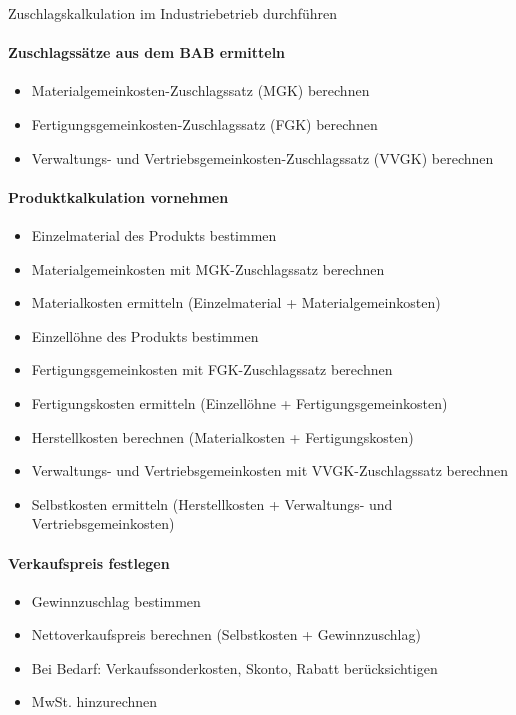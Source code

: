 \begin{KR}{Zuschlagskalkulation im Industriebetrieb durchführen}\\
\paragraph{Zuschlagssätze aus dem BAB ermitteln}
\begin{itemize}
    \item Materialgemeinkosten-Zuschlagssatz (MGK) berechnen
    \item Fertigungsgemeinkosten-Zuschlagssatz (FGK) berechnen
    \item Verwaltungs- und Vertriebsgemeinkosten-Zuschlagssatz (VVGK) berechnen
\end{itemize}

\paragraph{Produktkalkulation vornehmen}
\begin{itemize}
    \item Einzelmaterial des Produkts bestimmen
    \item Materialgemeinkosten mit MGK-Zuschlagssatz berechnen
    \item Materialkosten ermitteln (Einzelmaterial + Materialgemeinkosten)
    \item Einzellöhne des Produkts bestimmen
    \item Fertigungsgemeinkosten mit FGK-Zuschlagssatz berechnen
    \item Fertigungskosten ermitteln (Einzellöhne + Fertigungsgemeinkosten)
    \item Herstellkosten berechnen (Materialkosten + Fertigungskosten)
    \item Verwaltungs- und Vertriebsgemeinkosten mit VVGK-Zuschlagssatz berechnen
    \item Selbstkosten ermitteln (Herstellkosten + Verwaltungs- und Vertriebsgemeinkosten)
\end{itemize}

\paragraph{Verkaufspreis festlegen}
\begin{itemize}
    \item Gewinnzuschlag bestimmen
    \item Nettoverkaufspreis berechnen (Selbstkosten + Gewinnzuschlag)
    \item Bei Bedarf: Verkaufssonderkosten, Skonto, Rabatt berücksichtigen
    \item MwSt. hinzurechnen
\end{itemize}
\end{KR}

